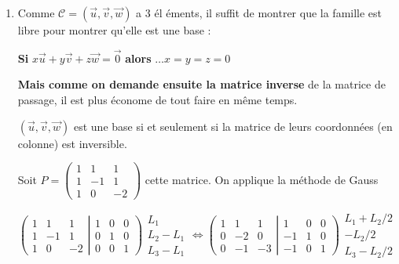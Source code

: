\begin{correction}
\begin{enumerate}
\begin{enumerate}
\item Comme $\mathcal{C}=\left( \vec{u},\vec{v},\vec{w}\right) $ a 3 \'{e}l%
\'{e}ments, il suffit de montrer que la famille est libre pour montrer
qu'elle est une base :

\textbf{Si }$x\vec{u}+y\vec{v}+z\vec{w}=\vec{0}$ \textbf{alors} $\dots
x=y=z=0$

\textbf{Mais comme on demande ensuite la matrice inverse} de la matrice de
passage, il est plus \'{e}conome de tout faire en m\^{e}me temps.

$\left( \vec{u},\vec{v},\vec{w}\right) $ est une base si et seulement si la
matrice de leurs coordonn\'{e}es (en colonne) est inversible.

Soit $P=\left( 
\begin{array}{rrr}
1 & 1 & 1 \\ 
1 & -1 & 1 \\ 
1 & 0 & -2%
\end{array}
\right) $ cette matrice. On applique la m\'{e}thode de Gauss

$\left( \left. 
\begin{array}{rrr}
1 & 1 & 1 \\ 
1 & -1 & 1 \\ 
1 & 0 & -2%
\end{array}
\right| 
\begin{array}{rrr}
1 & 0 & 0 \\ 
0 & 1 & 0 \\ 
0 & 0 & 1%
\end{array}
\right) 
\begin{array}{r}
L_{1} \\ 
L_{2}-L_{1} \\ 
L_{3}-L_{1}%
\end{array}
\Leftrightarrow \left( \left. 
\begin{array}{rrr}
1 & 1 & 1 \\ 
0 & -2 & 0 \\ 
0 & -1 & -3%
\end{array}
\right| 
\begin{array}{rrr}
1 & 0 & 0 \\ 
-1 & 1 & 0 \\ 
-1 & 0 & 1%
\end{array}
\right) 
\begin{array}{c}
L_{1}+L_{2}/2 \\ 
-L_{2}/2 \\ 
L_{3}-L_{2}/2%
\end{array}
$


\end{enumerate}
\end{enumerate}
\end{correction}
